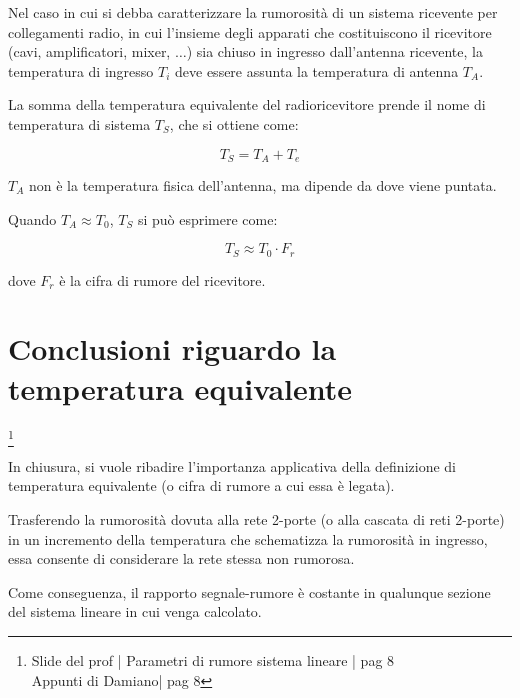 Nel caso in cui si debba caratterizzare la rumorosità di un sistema ricevente per collegamenti radio, 
in cui l'insieme degli apparati che costituiscono il ricevitore (cavi, amplificatori, mixer, $\dots$) sia chiuso in ingresso dall'antenna ricevente, 
la temperatura di ingresso $T_i$ deve essere assunta la temperatura di antenna $T_A$. \newline 

La somma della temperatura equivalente del radioricevitore prende il nome di temperatura di sistema $T_S$, 
che si ottiene come: 

{
    \Large 
    \begin{equation}
        T_S = T_A + T_e
    \end{equation}
}

$T_A$ non è la temperatura fisica dell'antenna, ma dipende da dove viene puntata. \newline 

Quando $T_A \approx T_0$, $T_S$ si può esprimere come: 

{
    \Large 
    \begin{equation}
        T_S \approx T_0 \cdot F_r
    \end{equation}
}

dove $F_r$ è la cifra di rumore del ricevitore. \newline 

\newpage 

\section{Conclusioni riguardo la temperatura equivalente}
\footnote{Slide del prof | Parametri di rumore sistema lineare | pag 8\\  
Appunti di Damiano| pag 8} 

In chiusura, si vuole ribadire l'importanza applicativa della definizione di temperatura equivalente (o cifra di rumore a cui essa è legata). \newline 

Trasferendo la rumorosità dovuta alla rete 2-porte (o alla cascata di reti 2-porte) in un incremento della temperatura che schematizza la rumorosità in ingresso, 
essa consente di considerare la rete stessa non rumorosa. \newline 

Come conseguenza, il rapporto segnale-rumore è costante in qualunque sezione del sistema lineare in cui venga calcolato. \newline 

